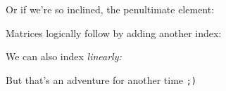\documentclass{article}
\begin{document}
Or if we're so inclined, the penultimate element:


Matrices logically follow by adding another index:


\begin{minipage}{\textwidth}
	We can also index \emph{linearly:}

	\vspace{1em}

\end{minipage}

But that's an adventure for another time \texttt{;)}
\end{document}
